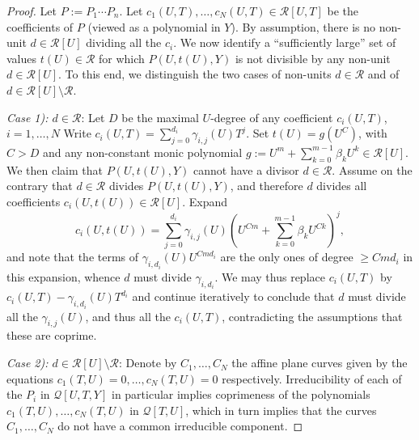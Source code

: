\documentclass[11pt,a4paper,reqno]{amsart}
\theoremstyle{definition}
\begin{document}
\begin{proof}
Let $P:=P_1\cdots P_n$.  Let $c_1(U,T),\dots, c_N(U,T)\in \mathcal R[U,T]$ be the coefficients of $P$ (viewed as a polynomial in $Y$). By assumption, there is no non-unit $d\in \mathcal R[U]$ dividing all the $c_i$. We now identify a ``sufficiently large'' set of values $t(U)\in \mathcal R$ for which $P(U,t(U),Y)$ is not divisible by any non-unit $d\in \mathcal R[U]$.
To this end, we distinguish the two cases of non-units $d\in \mathcal R$ and of $d\in \mathcal R[U]\setminus \mathcal R$.

{\it Case 1): $d\in \mathcal R$}: Let $D$ be the maximal $U$-degree of any coefficient $c_i(U,T)$, $i=1,\dots, N$
Write $c_i(U,T) = \sum_{j=0}^{d_i} \gamma_{i,j}(U)T^j$.
Set $t(U)=g(U^C)$, with $C>D$ and any non-constant monic polynomial $g:=U^m+\sum_{k=0}^{m-1}\beta_k U^k\in \mathcal R[U]$. We then claim that $P(U,t(U),Y)$ cannot have a divisor $d\in \mathcal R$.
Assume on the contrary that $d\in \mathcal R$ divides $P(U,t(U),Y)$, and therefore $d$ divides all coefficients $c_i(U,t(U))\in \mathcal R[U]$.
Expand $$c_i(U,t(U)) = \sum_{j=0}^{d_i}\gamma_{i,j}(U) (U^{Cm}+\sum_{k=0}^{m-1}\beta_k U^{Ck})^j,$$ %
and note that the terms of $\gamma_{i,d_i}(U) U^{Cmd_i}$ are the only ones of degree $\ge Cmd_i$ in this expansion, whence $d$ must divide $\gamma_{i,d_i}$. We may thus replace $c_i(U,T)$ by $c_i(U,T)-\gamma_{i,d_i}(U) T^{d_i}$ and continue iteratively to conclude that $d$ must divide all the $\gamma_{i,j}(U)$, and thus all the $c_i(U,T)$, contradicting the assumptions that these are coprime. 




{\it Case 2): $d\in \mathcal R[U]\setminus \mathcal R$}:
Denote by $C_1,\dots, C_N$ the affine plane curves given by the equations $c_1(T,U)=0,\dots, c_N(T,U)=0$ respectively. Irreducibility of each of the $P_i$ in $\mathcal Q[U,T,Y]$ in particular implies coprimeness of the polynomials $c_1(T,U),\dots, c_N(T,U)$ in $\mathcal Q[T,U]$, which in turn implies that the curves $C_1,\dots, C_N$ do not have a common irreducible component.


\end{proof}
\end{document}
